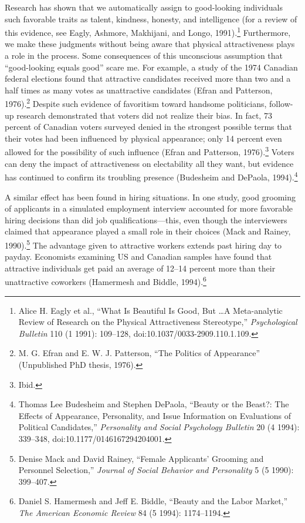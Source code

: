 {
 Research has shown that we automatically assign to good-looking
individuals such favorable traits as talent, kindness, honesty, and
intelligence (for a review of this evidence, see Eagly, Ashmore,
Makhijani, and Longo, 1991).\footnote{Alice H. Eagly et al., ``What Is Beautiful Is
Good, But \ldots A Meta-analytic Review of Research on the Physical
Attractiveness Stereotype,'' \textit{Psychological
Bulletin} 110 (1 1991): 109--128, doi:10.1037/0033-2909.110.1.109.} Furthermore, we make
these judgments without being aware that physical attractiveness plays
a role in the process. Some consequences of this unconscious assumption
that ``good-looking equals good''
scare me. For example, a study of the 1974 Canadian federal elections
found that attractive candidates received more than two and a half
times as many votes as unattractive candidates (Efran and Patterson,
1976).\footnote{M. G. Efran and E. W. J. Patterson, ``The
Politics of Appearance'' (Unpublished PhD thesis,
1976).} Despite such evidence of favoritism toward
handsome politicians, follow-up research demonstrated that voters did
not realize their bias. In fact, 73 percent of Canadian voters surveyed
denied in the strongest possible terms that their votes had been
influenced by physical appearance; only 14 percent even allowed for the
possibility of such influence (Efran and Patterson,
1976).\footnote{Ibid.} Voters can deny the impact of attractiveness
on electability all they want, but evidence has continued to confirm
its troubling presence (Budesheim and DePaola,
1994).\footnote{Thomas Lee Budesheim and Stephen DePaola,
``Beauty or the Beast?: The Effects of Appearance,
Personality, and Issue Information on Evaluations of Political
Candidates,'' \textit{Personality and Social
Psychology Bulletin} 20 (4 1994): 339--348,
doi:10.1177/0146167294204001.}}

{
 A similar effect has been found in hiring situations. In one
study, good grooming of applicants in a simulated employment interview
accounted for more favorable hiring decisions than did job
qualifications---this, even though the interviewers claimed that
appearance played a small role in their choices (Mack and Rainey,
1990).\footnote{Denise Mack and David Rainey, ``Female
Applicants' Grooming and Personnel
Selection,'' \textit{Journal of Social Behavior and
Personality} 5 (5 1990): 399--407.} The advantage given to attractive workers
extends past hiring day to payday. Economists examining US and Canadian
samples have found that attractive individuals get paid an average of
12--14 percent more than their unattractive coworkers (Hamermesh and
Biddle, 1994).\footnote{Daniel S. Hamermesh and Jeff E. Biddle,
``Beauty and the Labor Market,''
\textit{The American Economic Review} 84 (5 1994): 1174--1194.}}

